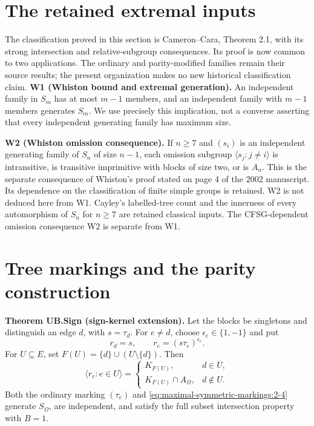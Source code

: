 \section{The retained extremal inputs}
The classification proved in this section is Cameron--Cara, Theorem 2.1, with its strong intersection and relative-subgroup consequences. Its proof is now common to two applications. The ordinary and parity-modified families remain their source results; the present organization makes no new historical classification claim.
\textbf{W1 (Whiston bound and extremal generation).} An independent family in \(S_m\) has at most \(m-1\) members, and an independent family with \(m-1\) members generates \(S_m\). We use precisely this implication, not a converse asserting that every independent generating family has maximum size.

\textbf{W2 (Whiston omission consequence).} If \(n\geq7\) and \((s_i)\) is an independent generating family of \(S_n\) of size \(n-1\), each omission subgroup \(\langle s_j:j\ne i\rangle\) is intransitive, is transitive imprimitive with blocks of size two, or is \(A_n\). This is the separate consequence of Whiston's proof stated on page 4 of the 2002 manuscript. Its dependence on the classification of finite simple groups is retained. W2 is not deduced here from W1.
Cayley's labelled-tree count and the innerness of every automorphism of \(S_n\) for \(n\geq7\) are retained classical inputs. The CFSG-dependent omission consequence W2 is separate from W1.

\section{Tree markings and the parity construction}
\textbf{Theorem UB.Sign (sign-kernel extension).} Let the blocks be singletons and distinguish an edge \(d\), with \(s=\tau_d\). For \(e\ne d\), choose \(\epsilon_e\in\{1,-1\}\) and put \begin{equation}
r_d=s,\qquad r_e=(s\tau_e)^{\epsilon_e}.
\label{eq:maximal-symmetric-markings:2-4}
\end{equation} For \(U\subseteq E\), set \(F(U)=\{d\}\cup(U\setminus\{d\})\). Then \begin{equation}
\langle r_e:e\in U\rangle=
\begin{cases}
K_{F(U)},&d\in U,\\
K_{F(U)}\cap A_\Omega,&d\notin U.
\end{cases}
\label{eq:maximal-symmetric-markings:2-5}
\end{equation} Both the ordinary marking \((\tau_e)\) and \eqref{eq:maximal-symmetric-markings:2-4} generate \(S_\Omega\), are independent, and satisfy the full subset intersection property with \(B=1\).

